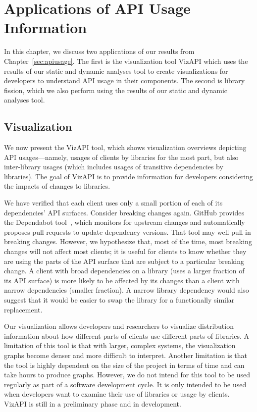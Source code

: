 \chapter{Applications of API Usage Information}
\label{sec:applications}
In this chapter, we discuss two applications of our results from Chapter~\ref{sec:apiusage}. The first is the visualization tool VizAPI which uses the results of our static and dynamic analyses tool to create visualizations for developers to understand API usage in their components. The second is library fission, which we also perform using the results of our static and dynamic analyses tool.


\section{Visualization}
\label{sec:visualization}
We now present the VizAPI tool, which shows visualization overviews depicting API usages---namely, usages of clients by libraries for the most part, but also inter-library usages (which includes usages of transitive dependencies by libraries). The goal of VizAPI is to provide information for developers considering the impacts of changes to libraries.

We have verified that each client uses only a small portion of each of its dependencies' API surfaces. Consider breaking changes again. GitHub provides the Dependabot tool~\cite{mullans20:_keep_depen}, which monitors for upstream changes and automatically proposes pull requests to update dependency versions. That tool may well pull in breaking changes. However, we hypothesize that, most of the time, most breaking changes will not affect most clients; it is useful for clients to know whether they are using the parts of the API surface that are subject to a particular breaking change. A client with broad dependencies on a library (uses a larger fraction of its API surface) is more likely to be affected by its changes than a client with narrow dependencies (smaller fraction). A narrow library dependency would also suggest that it would be easier to swap the library for a functionally similar replacement.

Our visualization allows developers and
researchers to visualize distribution information about how different
parts of clients use different parts of libraries. 
A limitation of this tool is that with larger, complex systems, the visualization graphs become denser and more difficult to interpret.
Another limitation is that the tool is highly dependent on the size of the project in terms of time and can take hours to produce graphs.
However, we do not intend for this tool to be used regularly as part of a software development cycle. 
It is only intended to be used when developers want to examine their use of libraries or usage by clients.
VizAPI is still in a preliminary phase and in development.

